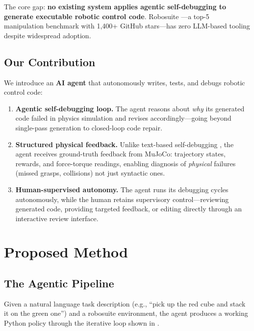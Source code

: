 \documentclass[11pt]{article}
\begin{document}
The core gap: \textbf{no existing system applies agentic self-debugging to generate executable robotic control code}. Robosuite \citep{zhu2020robosuite}---a top-5 manipulation benchmark with 1,400+ GitHub stars---has zero LLM-based tooling despite widespread adoption.

\subsection{Our Contribution}

We introduce an \textbf{AI agent} that autonomously writes, tests, and debugs robotic control code:
\begin{enumerate}[nosep]
    \item \textbf{Agentic self-debugging loop.} The agent reasons about \emph{why} its generated code failed in physics simulation and revises accordingly---going beyond single-pass generation to closed-loop code repair.
    \item \textbf{Structured physical feedback.} Unlike text-based self-debugging \citep{olausson2024selfrepair, besimulator2024}, the agent receives ground-truth feedback from MuJoCo: trajectory states, rewards, and force-torque readings, enabling diagnosis of \emph{physical} failures (missed grasps, collisions) not just syntactic ones.
    \item \textbf{Human-supervised autonomy.} The agent runs its debugging cycles autonomously, while the human retains supervisory control---reviewing generated code, providing targeted feedback, or editing directly through an interactive review interface.
\end{enumerate}

\section{Proposed Method}
\label{sec:method}

\subsection{The Agentic Pipeline}

Given a natural language task description (e.g., ``pick up the red cube and stack it on the green one'') and a robosuite environment, the agent produces a working Python policy through the iterative loop shown in .
\end{document}
